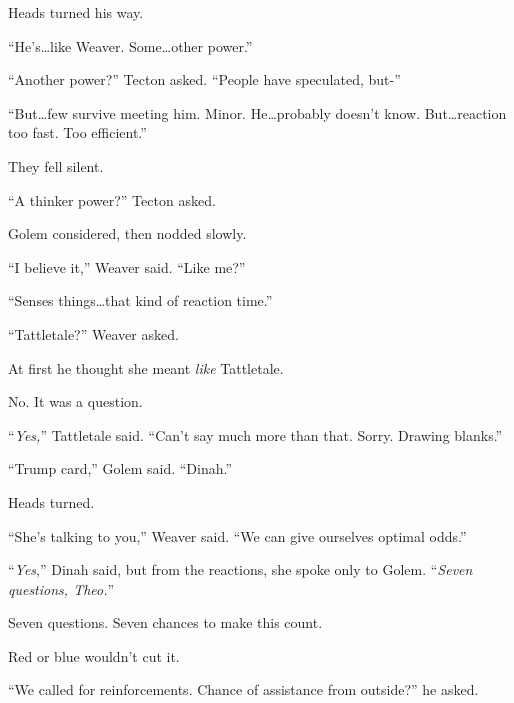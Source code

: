 Heads turned his way.



``He's\ldots like Weaver.  Some\ldots other power.''



``Another power?''  Tecton asked.  ``People have speculated, but-''



``But\ldots few survive meeting him.  Minor.  He\ldots probably doesn't know.  But\ldots reaction too fast.  Too efficient.''



They fell silent.



``A thinker power?'' Tecton asked.



Golem considered, then nodded slowly.



``I believe it,'' Weaver said.  ``Like me?''



``Senses things\ldots that kind of reaction time.''



``Tattletale?'' Weaver asked.



At first he thought she meant \emph{like} Tattletale.



No.  It was a question.



``\emph{Yes,}'' Tattletale said.  ``Can't say much more than that.  Sorry.  Drawing blanks.''



``Trump card,'' Golem said.  ``Dinah.''



Heads turned.



``She's talking to you,'' Weaver said.  ``We can give ourselves optimal odds.''



``\emph{Yes},'' Dinah said, but from the reactions, she spoke only to Golem.  ``\emph{Seven questions, Theo.}''



Seven questions.  Seven chances to make this count.



Red or blue wouldn't cut it.



``We called for reinforcements.  Chance of assistance from outside?'' he asked.




